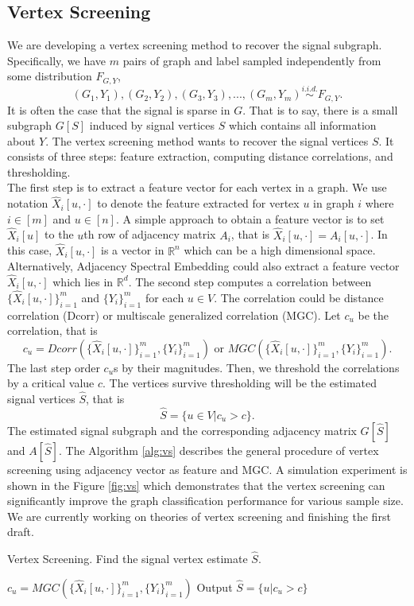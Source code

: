 \documentclass[simplex.tex]{subfiles}
\begin{document}
\subsection{Vertex Screening}
We are developing a vertex screening method to recover the signal subgraph. Specifically, we have $m$ pairs of graph and label sampled independently from some distribution $F_{G,Y}$,
\[(G_1,Y_1),(G_2,Y_2),(G_3,Y_3),...,(G_m,Y_m) \overset{i.i.d.}{\sim} F_{G,Y}. \] 
It is often the case that the signal is sparse in $G$. That is to say, there is a small subgraph $G[S]$ induced by signal vertices $S$ which contains all information about $Y$. The vertex screening method wants to recover the signal vertices $S$. It consists of three steps: feature extraction, computing distance correlations, and thresholding. \\

The first step is to extract a feature vector for each vertex in a graph. We use notation $\hat{X}_{i}[u,\cdot]$ to denote the feature extracted for vertex $u$ in graph $i$ where $i \in [m]$ and $u \in [n]$. A simple approach to obtain a feature vector is to set $\hat{X}_{i}[u]$ to the $u$th row of adjacency matrix $A_i$, that is $\hat{X}_{i}[u,\cdot]=A_i[u,\cdot]$. In this case,  $\hat{X}_{i}[u,\cdot]$ is a vector in $\mathbb{R}^n$ which can be a high dimensional space. Alternatively, Adjacency Spectral Embedding could also extract a feature vector $\hat{X}_{i}[u,\cdot]$ which lies in $\mathbb{R}^d$. The second step computes a correlation between  $\{\hat{X}_{i}[u,\cdot]\}_{i=1}^m$ and $\{Y_i\}_{i=1}^m$ for each $u \in V$. The correlation could be distance correlation (Dcorr) or multiscale generalized correlation (MGC). Let $c_u$ be the correlation, that is
\[ c_u = Dcorr(\{\hat{X}_{i}[u,\cdot]\}_{i=1}^m, \{Y_i\}_{i=1}^m ) \text{ or } MGC(\{\hat{X}_{i}[u,\cdot]\}_{i=1}^m, \{Y_i\}_{i=1}^m). \]
The last step order $c_u$s by their magnitudes. Then, we threshold the correlations by a critical value $c$. The vertices survive thresholding will be the estimated signal vertices $\hat{S}$, that is 
\[\hat{S} = \{u \in V | c_u > c\}.\]
The estimated signal subgraph and the corresponding adjacency matrix $G[\hat{S}]$ and $A[\hat{S}]$. The Algorithm \ref{alg:vs} describes the general procedure of vertex screening using adjacency vector as feature and MGC. A simulation experiment is shown in the Figure \ref{fig:vs} which demonstrates that the vertex screening can significantly improve the graph classification performance for various sample size. We are currently working on theories of vertex screening and finishing the first draft.
\clearpage
\begin{algorithm}
	\caption{Vertex Screening. Find the signal vertex estimate $\hat{S}$.}
	\label{alg:vs}
	\begin{algorithmic}[1]
		\State $c_u = MGC(\{\hat{X}_{i}[u,\cdot]\}_{i=1}^m, \{Y_i\}_{i=1}^m )$
		\EndFor
		\State Output $\hat{S} = \{u| c_u > c\}$
		\EndProcedure
	\end{algorithmic}
\end{algorithm}
\end{document}
